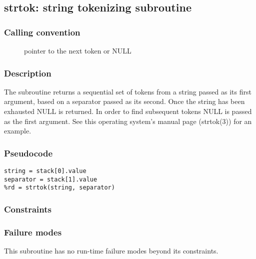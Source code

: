 \clearpage
{}
{}
\label{subr:strtok}
\subsection*{strtok: string tokenizing subroutine}

\subsubsection*{Calling convention}

\begin{description}
\item[] pointer to the next token or NULL
\end{description}

\subsubsection*{Description}

The  subroutine returns a sequential set of tokens
from a string passed as its first argument, based on a separator
passed as its second.  Once the string has been exhausted NULL is
returned.  In order to find subsequent tokens NULL is passed as the
first argument.  See this operating system's 
manual page (strtok(3)) for an example.

\subsubsection*{Pseudocode}

\begin{verbatim}
string = stack[0].value
separator = stack[1].value
%rd = strtok(string, separator)
\end{verbatim}

\subsubsection*{Constraints}

\subsubsection*{Failure modes}

This subroutine has no run-time failure modes beyond its constraints.
